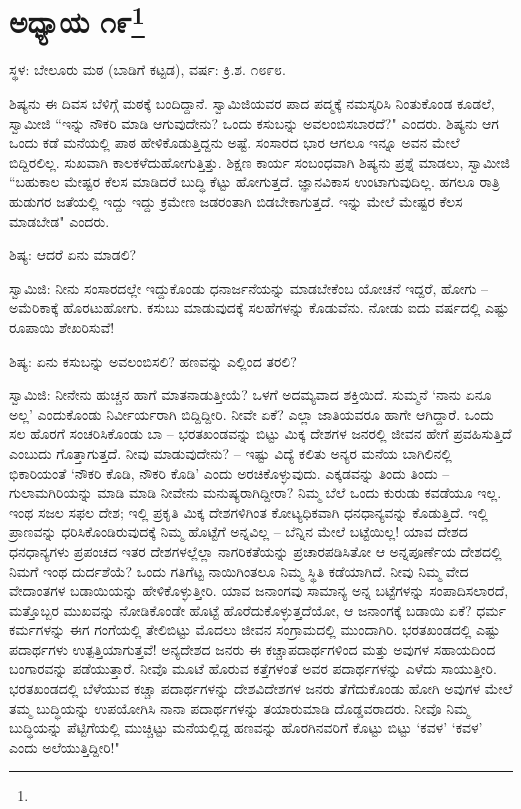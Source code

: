 \newpage

\chapter[ಅಧ್ಯಾಯ ೧೯]{ಅಧ್ಯಾಯ ೧೯\protect\footnote{}}

\centerline{ಸ್ಥಳ: ಬೇಲೂರು ಮಠ (ಬಾಡಿಗೆ ಕಟ್ಟಡ), ವರ್ಷ: ಕ್ರಿ.ಶ. ೧೮೯೮.}

ಶಿಷ್ಯನು ಈ ದಿವಸ ಬೆಳಿಗ್ಗೆ ಮಠಕ್ಕೆ ಬಂದಿದ್ದಾನೆ. ಸ್ವಾಮಿಜಿಯವರ ಪಾದ ಪದ್ಮಕ್ಕೆ ನಮಸ್ಕರಿಸಿ ನಿಂತುಕೊಂಡ ಕೂಡಲೆ, ಸ್ವಾಮೀಜಿ “ಇನ್ನು ನೌಕರಿ ಮಾಡಿ ಆಗುವುದೇನು? ಒಂದು ಕಸುಬನ್ನು ಅವಲಂಬಿಸಬಾರದೆ?" ಎಂದರು. ಶಿಷ್ಯನು ಆಗ ಒಂದು ಕಡೆ ಮನೆಯಲ್ಲಿ ಪಾಠ ಹೇಳಿಕೊಡುತ್ತಿದ್ದನು ಅಷ್ಟೆ. ಸಂಸಾರದ ಭಾರ ಆಗಲೂ ಇನ್ನೂ ಅವನ ಮೇಲೆ ಬಿದ್ದಿರಲಿಲ್ಲ. ಸುಖವಾಗಿ ಕಾಲಕಳೆದುಹೋಗುತ್ತಿತ್ತು. ಶಿಕ್ಷಣ ಕಾರ್ಯ ಸಂಬಂಧವಾಗಿ ಶಿಷ್ಯನು ಪ್ರಶ್ನೆ ಮಾಡಲು, ಸ್ವಾಮೀಜಿ “ಬಹುಕಾಲ ಮೇಷ್ಟರ ಕೆಲಸ ಮಾಡಿದರೆ ಬುದ್ಧಿ ಕೆಟ್ಟು ಹೋಗುತ್ತದೆ. ಜ್ಞಾನವಿಕಾಸ ಉಂಟಾಗುವುದಿಲ್ಲ. ಹಗಲೂ ರಾತ್ರಿ ಹುಡುಗರ ಜತೆಯಲ್ಲಿ ಇದ್ದು ಇದ್ದು ಕ್ರಮೇಣ ಜಡರಂತಾಗಿ ಬಿಡಬೇಕಾಗುತ್ತದೆ. ಇನ್ನು ಮೇಲೆ ಮೇಷ್ಟರ ಕೆಲಸ ಮಾಡಬೇಡ" ಎಂದರು.

ಶಿಷ್ಯ: ಆದರೆ ಏನು ಮಾಡಲಿ?

ಸ್ವಾಮಿಜಿ: ನೀನು ಸಂಸಾರದಲ್ಲೇ ಇದ್ದುಕೊಂಡು ಧನಾರ್ಜನೆಯನ್ನು ಮಾಡಬೇಕೆಂಬ ಯೋಚನೆ ಇದ್ದರೆ, ಹೋಗು – ಅಮೆರಿಕಾಕ್ಕೆ ಹೊರಟುಹೋಗು. ಕಸುಬು ಮಾಡುವುದಕ್ಕೆ ಸಲಹೆಗಳನ್ನು ಕೊಡುವೆನು. ನೋಡು ಐದು ವರ್ಷದಲ್ಲಿ ಎಷ್ಟು ರೂಪಾಯಿ ಶೇಖರಿಸುವೆ!

ಶಿಷ್ಯ: ಏನು ಕಸುಬನ್ನು ಅವಲಂಬಿಸಲಿ? ಹಣವನ್ನು ಎಲ್ಲಿಂದ ತರಲಿ?

ಸ್ವಾಮಿಜಿ: ನೀನೇನು ಹುಚ್ಚನ ಹಾಗೆ ಮಾತನಾಡುತ್ತೀಯೆ? ಒಳಗೆ ಅದಮ್ಯವಾದ ಶಕ್ತಿಯಿದೆ. ಸುಮ್ಮನೆ ‘ನಾನು ಏನೂ ಅಲ್ಲ’ ಎಂದುಕೊಂಡು ನಿರ್ವೀರ್ಯರಾಗಿ ಬಿದ್ದಿದ್ದೀರಿ. ನೀವೇ ಏಕೆ? ಎಲ್ಲಾ ಜಾತಿಯವರೂ ಹಾಗೇ ಆಗಿದ್ದಾರೆ. ಒಂದು ಸಲ ಹೊರಗೆ ಸಂಚರಿಸಿಕೊಂಡು ಬಾ – ಭರತಖಂಡವನ್ನು ಬಿಟ್ಟು ಮಿಕ್ಕ ದೇಶಗಳ ಜನರಲ್ಲಿ ಜೀವನ ಹೇಗೆ ಪ್ರವಹಿಸುತ್ತಿದೆ ಎಂಬುದು ಗೊತ್ತಾಗುತ್ತದೆ. ನೀವು ಮಾಡುವುದೇನು? – ಇಷ್ಟು ವಿದ್ಯೆ ಕಲಿತು ಅನ್ಯರ ಮನೆಯ ಬಾಗಿಲಿನಲ್ಲಿ ಭಿಕಾರಿಯಂತೆ ‘ನೌಕರಿ ಕೊಡಿ, ನೌಕರಿ ಕೊಡಿ’ ಎಂದು ಅರಚಿಕೊಳ್ಳುವುದು. ಎಕ್ಕಡವನ್ನು ತಿಂದು ತಿಂದು – ಗುಲಾಮಗಿರಿಯನ್ನು ಮಾಡಿ ಮಾಡಿ ನೀವೇನು ಮನುಷ್ಯರಾಗಿದ್ದೀರಾ? ನಿಮ್ಮ ಬೆಲೆ ಒಂದು ಕುರುಡು ಕವಡೆಯೂ ಇಲ್ಲ. ಇಂಥ ಸಜಲ ಸಫಲ ದೇಶ; ಇಲ್ಲಿ ಪ್ರಕೃತಿ ಮಿಕ್ಕ ದೇಶಗಳಿಗಿಂತ ಕೋಟ್ಯಧಿಕವಾಗಿ ಧನಧಾನ್ಯವನ್ನು ಕೊಡುತ್ತಿದೆ. ಇಲ್ಲಿ ಪ್ರಾಣವನ್ನು ಧರಿಸಿಕೊಂಡಿರುವುದಕ್ಕೆ ನಿಮ್ಮ ಹೊಟ್ಟೆಗೆ ಅನ್ನವಿಲ್ಲ – ಬೆನ್ನಿನ ಮೇಲೆ ಬಟ್ಟೆಯಿಲ್ಲ! ಯಾವ ದೇಶದ ಧನಧಾನ್ಯಗಳು ಪ್ರಪಂಚದ ಇತರ ದೇಶಗಳಲ್ಲೆಲ್ಲಾ ನಾಗರಿಕತೆಯನ್ನು ಪ್ರಚಾರಪಡಿಸಿತೋ ಆ ಅನ್ನಪೂರ್ಣೆಯ ದೇಶದಲ್ಲಿ ನಿಮಗೆ ಇಂಥ ದುರ್ದಶೆಯೆ? ಒಂದು ಗತಿಗೆಟ್ಟ ನಾಯಿಗಿಂತಲೂ ನಿಮ್ಮ ಸ್ಥಿತಿ ಕಡೆಯಾಗಿದೆ. ನೀವು ನಿಮ್ಮ ವೇದ ವೇದಾಂತಗಳ ಬಡಾಯಿಯನ್ನು ಹೇಳಿಕೊಳ್ಳುತ್ತೀರಿ. ಯಾವ ಜನಾಂಗವು ಸಾಮಾನ್ಯ ಅನ್ನ ಬಟ್ಟೆಗಳನ್ನು ಸಂಪಾದಿಸಲಾರದೆ, ಮತ್ತೊಬ್ಬರ ಮುಖವನ್ನು ನೋಡಿಕೊಂಡೇ ಹೊಟ್ಟೆ ಹೊರೆದುಕೊಳ್ಳುತ್ತದೆಯೋ, ಆ ಜನಾಂಗಕ್ಕೆ ಬಡಾಯಿ ಏಕೆ? ಧರ್ಮ ಕರ್ಮಗಳನ್ನು ಈಗ ಗಂಗೆಯಲ್ಲಿ ತೇಲಿಬಿಟ್ಟು ಮೊದಲು ಜೀವನ ಸಂಗ್ರಾಮದಲ್ಲಿ ಮುಂದಾಗಿರಿ. ಭರತಖಂಡದಲ್ಲಿ ಎಷ್ಟು ಪದಾರ್ಥಗಳು ಉತ್ಪತ್ತಿಯಾಗುತ್ತವೆ! ಅನ್ಯದೇಶದ ಜನರು ಈ ಕಚ್ಚಾಪದಾರ್ಥಗಳಿಂದ ಮತ್ತು ಅವುಗಳ ಸಹಾಯದಿಂದ ಬಂಗಾರವನ್ನು ಪಡೆಯುತ್ತಾರೆ. ನೀವೊ ಮೂಟೆ ಹೊರುವ ಕತ್ತೆಗಳಂತೆ ಅವರ ಪದಾರ್ಥಗಳನ್ನು ಎಳೆದು ಸಾಯುತ್ತೀರಿ. ಭರತಖಂಡದಲ್ಲಿ ಬೆಳೆಯುವ ಕಚ್ಚಾ ಪದಾರ್ಥಗಳನ್ನು ದೇಶವಿದೇಶಗಳ ಜನರು ತೆಗೆದುಕೊಂಡು ಹೋಗಿ ಅವುಗಳ ಮೇಲೆ ತಮ್ಮ ಬುದ್ಧಿಯನ್ನು ಉಪಯೋಗಿಸಿ ನಾನಾ ಪದಾರ್ಥಗಳನ್ನು ತಯಾರುಮಾಡಿ ದೊಡ್ಡವರಾದರು. ನೀವೊ ನಿಮ್ಮ ಬುದ್ಧಿಯನ್ನು ಪೆಟ್ಟಿಗೆಯಲ್ಲಿ ಮುಚ್ಚಿಟ್ಟು ಮನೆಯಲ್ಲಿದ್ದ ಹಣವನ್ನು ಹೊರಗಿನವರಿಗೆ ಕೊಟ್ಟು ಬಿಟ್ಟು ‘ಕವಳ’ ‘ಕವಳ’ ಎಂದು ಅಲೆಯುತ್ತಿದ್ದೀರಿ!"

